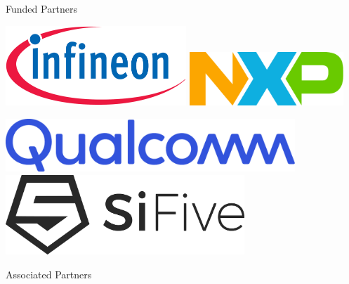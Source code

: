 \documentclass[portrait,a0]{a0poster}
\begin{document}
\begin{minipage}[t]{500mm}
{\begin{minipage}{0.5\textwidth}
\begin{mdframed}[style=partners]
{
            }
        \end{mdframed}
        \centering
        Funded Partners
    \end{minipage}
    \hfill
    \begin{minipage}{0.4\textwidth}
        \begin{mdframed}[style=partners]
            \parbox[t][13cm][t]{\linewidth}{
            \centering
            \vfill
            
            \hfill \includegraphics[height=3cm]{Infineon-Logo} \hfill 
            \includegraphics[height=2cm]{NXP_Semiconductors_logo_2023} \hfill

            \vfill

            \includegraphics[height=2cm]{Qualcomm-Logo}
            \vfill
            \includegraphics[height=3cm]{SiFive_logo}
            \vfill

            }
        \end{mdframed}
        \centering
        Associated Partners
    \end{minipage}
    \hfill
    }
\end{minipage}
\end{document}
